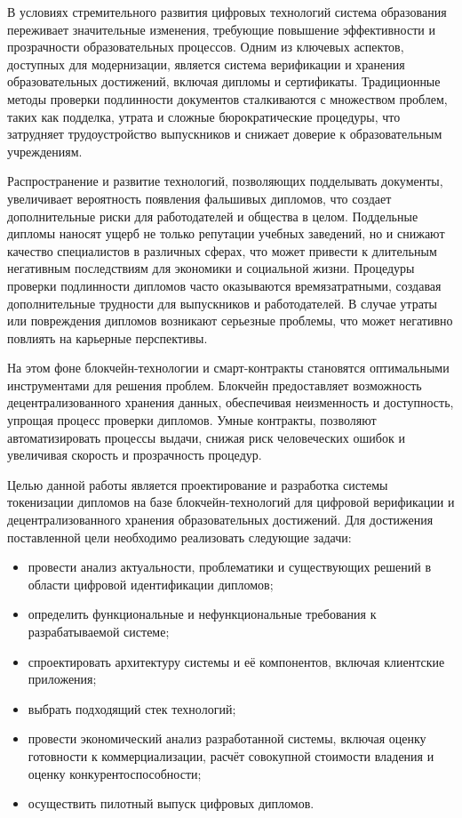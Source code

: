 \label{sec:introduction}

В условиях стремительного развития цифровых технологий система образования переживает значительные изменения, требующие повышение эффективности и прозрачности образовательных процессов. Одним из ключевых аспектов, доступных для модернизации, является система верификации и хранения образовательных достижений, включая дипломы и сертификаты. Традиционные методы проверки подлинности документов сталкиваются с множеством проблем, таких как подделка, утрата и сложные бюрократические процедуры, что затрудняет трудоустройство выпускников и снижает доверие к образовательным учреждениям.

Распространение и развитие технологий, позволяющих подделывать документы, увеличивает вероятность появления фальшивых дипломов, что создает дополнительные риски для работодателей и общества в целом. Поддельные дипломы наносят ущерб не только репутации учебных заведений, но и снижают качество специалистов в различных сферах, что может привести к длительным негативным последствиям для экономики и социальной жизни. Процедуры проверки подлинности дипломов часто оказываются времязатратными, создавая дополнительные трудности для выпускников и работодателей. В случае утраты или повреждения дипломов возникают серьезные проблемы, что может негативно повлиять на карьерные перспективы.

На этом фоне блокчейн-технологии и смарт-контракты становятся оптимальными инструментами для решения проблем. Блокчейн предоставляет возможность децентрализованного хранения данных, обеспечивая неизменность и доступность, упрощая процесс проверки дипломов. Умные контракты, позволяют автоматизировать процессы выдачи, снижая риск человеческих ошибок и увеличивая скорость и прозрачность процедур.

Целью данной работы является проектирование и разработка системы токенизации дипломов на базе блокчейн-технологий для цифровой верификации и децентрализованного хранения образовательных достижений. Для достижения поставленной цели необходимо реализовать следующие задачи:

\begin{itemize}
    \item провести анализ актуальности, проблематики и существующих решений в области цифровой идентификации дипломов;
    \item определить функциональные и нефункциональные требования к разрабатываемой системе;
    \item спроектировать архитектуру системы и её компонентов, включая клиентские приложения;
    \item выбрать подходящий стек технологий;
    \item провести экономический анализ разработанной системы, включая оценку готовности к коммерциализации, расчёт совокупной стоимости владения и оценку конкурентоспособности;
    \item осуществить пилотный выпуск цифровых дипломов.
\end{itemize}

